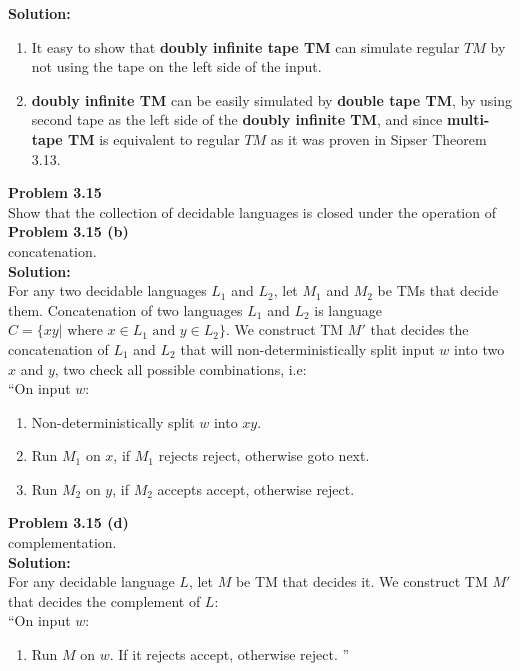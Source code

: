 \documentclass{article}
\newcommand\curl[1]{\{#1\}}
\newcommand{\problem}[1]{\large{\textbf{Problem #1}}\\}
\begin{document}
\textbf{Solution:}\\
\begin{enumerate}[1., leftmargin = 1.5cm]
\itemsep0em
\item It easy to show that \textbf{doubly infinite tape TM} can simulate regular $TM$ by not using the 
tape on the left side of the input.
\item \textbf{doubly infinite TM} can be easily simulated by \textbf{double tape TM}, by using second tape
as the left side of the \textbf{doubly infinite TM}, and since \textbf{ multi-tape TM} is equivalent to
regular $TM$ as it was proven in Sipser Theorem 3.13. \\
\end{enumerate}
\problem{3.15}
Show that the collection of decidable languages is closed under the operation of\\
\problem{3.15  (b)}
concatenation.\\

\textbf{Solution:}\\
For any two decidable languages $L_1$ and $L_2$, let $M_1$ and $M_2$ be TMs that decide them.
Concatenation of two languages $L_1$ and $L_2$ is language $C = \curl{xy | \text{ where 
    } x \in L_1 \text{ and } y \in L_2}$.
We construct TM $M'$ that decides the concatenation of $L_1$ and $L_2$ that will non-deterministically 
split input $w$ into two $x$ and $y$, two check all possible combinations, i.e:\\

``On input $w$:
\begin{enumerate}[1., leftmargin = 1.5cm]
\itemsep0em
\item Non-deterministically split $w$ into $xy$.
\item Run $M_1$ on $x$, if $M_1$ rejects reject, otherwise goto next.
\item Run $M_2$ on $y$, if $M_2$ accepts accept, otherwise reject.
\end{enumerate}


\problem{3.15  (d)}
complementation.\\

\textbf{Solution:}\\
For any decidable language $L$, let $M$ be TM that decides it.
We construct TM $M'$ that decides the complement  of $L$: \\

``On input $w$:
\begin{enumerate}[1., leftmargin = 1.5cm]
\itemsep0em
\item Run $M$ on $w$. If it rejects accept, otherwise reject. ''
\end{enumerate}
\end{document}
